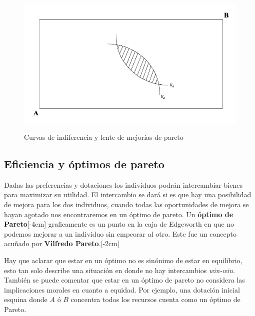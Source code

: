 \begin{figure}[h]
    \centering
    \caption{Curvas de indiferencia y lente de mejorías de pareto}
    \includegraphics[width=\textwidth]{Figuras/EG Curvas de indiferencias.jpeg}
    \label{fig:caja indiferencias}
\end{figure}

\subsection{Eficiencia y óptimos de pareto}

Dadas las preferencias y dotaciones los individuos podrán intercambiar bienes para maximizar su utilidad. El intercambio se dará si es que hay una posibilidad de mejora para los dos individuos, cuando todas las oportunidades de mejora se hayan agotado nos encontraremos en un óptimo de pareto. Un \textbf{óptimo de Pareto}[-4cm] graficamente es un punto en la caja de Edgeworth en que no podemos mejorar a un individuo sin empeorar al otro. Este fue un concepto acuñado por \textbf{Vilfredo Pareto}.[-2cm]

Hay que aclarar que estar en un óptimo no es sinónimo de estar en equilibrio, esto tan solo describe una situación en donde no hay intercambios \textit{win-win}. También se puede comentar que estar en un óptimo de pareto no considera las implicaciones morales en cuanto a equidad. Por ejemplo, una dotación inicial esquina donde $A$ ó $B$ concentra todos los recursos cuenta como un óptimo de Pareto.

